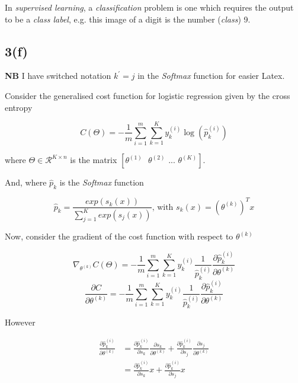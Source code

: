 \documentclass[12pt, a4paper,reqno]{article}
\begin{document}
In \emph{supervised learning}, a \emph{classification} problem is one which requires the output to be a \emph{class label}, e.g. this image of a digit is the number (\emph{class}) 9.

\subsection*{3(f)}
\textbf{NB} I have switched notation $k^{'} = j$ in the \emph{Softmax} function for easier Latex.

Consider the generalised cost function for logistic regression given by the cross entropy

\begin{equation}
C(\Theta) = -\frac{1}{m}\sum_{i=1}^{m} \sum_{k=1}^{K}y_k^{(i)}\log\left(\hat{p}_k^{(i)}\right)
\end{equation}

where $\Theta \in \mathcal{R}^{K\times n}$ is the matrix $[\theta^{(1)}\text{  }\theta^{(2)}\text{  ...  }\theta^{(K)}]$.

And, where $\hat{p}_k$ is the \emph{Softmax} function

\begin{equation}
\hat{p}_k = \frac{exp(s_k(x))}{\sum_{j=1}^K exp(s_j(x))}
\text{, with }
s_k(x) = \left(\theta^{(k)}\right)^T x
\end{equation}

Now, consider the gradient of the cost function with respect to $\theta^{(k)}$

\begin{equation}
\nabla_{\theta^{(k)}}C(\Theta) = -\frac{1}{m}\sum_{i=1}^{m}\sum_{k=1}^{K} y_k^{(i)}\frac{1}{\hat{p}_k^{(i)}}\frac{\partial{\hat{p}_k^{(i)}}}{\partial{\theta^{(k)}}}
\end{equation}
\begin{equation}
\frac{\partial{C}}{\partial{\theta^{(k)}}}= -\frac{1}{m}\sum_{i=1}^{m}\sum_{k=1}^{K} y_k^{(i)}\frac{1}{\hat{p}_k^{(i)}}\frac{\partial{\hat{p}_k^{(i)}}}{\partial{\theta^{(k)}}}
\end{equation}

However

\begin{align}
\frac{\partial{\hat{p}_k^{(i)}}}{\partial{\theta^{(k)}}} &= \frac{\partial{\hat{p}_k^{(i)}}}{\partial{s_k}}\frac{\partial{s_k}}{\partial{\theta^{(k)}}} +
\frac{\partial{\hat{p}_k^{(i)}}}{\partial{s_j}}\frac{\partial{s_j}}{\partial{\theta^{(k)}}}\\
&= \frac{\partial{\hat{p}_k^{(i)}}}{\partial{s_k}}x + \frac{\partial{\hat{p}_k^{(i)}}}{\partial{s_j}}x
\end{align}
\end{document}
